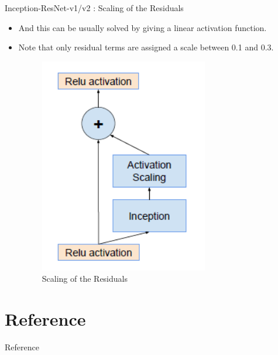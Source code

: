 \documentclass{beamer}
\begin{document}
\begin{frame}{Inception-ResNet-v1/v2 : Scaling of the Residuals }
	\begin{itemize}
		\item And this can be usually solved by giving a linear activation function.
		\item Note that only residual terms are assigned a scale between 0.1 and 0.3.
		\vspace{7pt}
		\begin{figure}[h]		
			\centering
			\includegraphics[scale=0.7]{./in_res_v2/scaling.PNG}
			\caption{Scaling of the Residuals}
			\label{scaling}
		\end{figure}
	\end{itemize}
\end{frame}


\section{Reference}
\begin{frame}[allowframebreaks]{Reference}
	
\end{frame}
\end{document}

